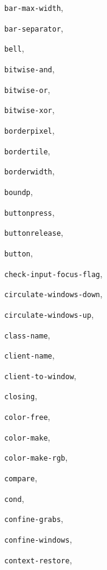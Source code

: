 \begin{theindex}
\item {\tt bar-max-width}, {\bf\pageref{bar-max-width}}
\item {\tt bar-separator}, {\bf\pageref{bar-separator}}
\item {\tt bell}, {\bf\pageref{bell}}
\item {\tt bitwise-and}, {\bf\pageref{bitwise-and}}
\item {\tt bitwise-or}, {\bf\pageref{bitwise-or}}
\item {\tt bitwise-xor}, {\bf\pageref{bitwise-xor}}
\item {\tt borderpixel}, {\bf\pageref{borderpixel}}
\item {\tt bordertile}, {\bf\pageref{bordertile}}
\item {\tt borderwidth}, {\bf\pageref{borderwidth}}
\item {\tt boundp}, {\bf\pageref{boundp}}
\item {\tt buttonpress}, {\bf\pageref{buttonpress}}
\item {\tt buttonrelease}, {\bf\pageref{buttonrelease}}
\item {\tt button}, {\bf\pageref{button}}
\item {\tt check-input-focus-flag}, {\bf\pageref{check-input-focus-flag}}
\item {\tt circulate-windows-down}, {\bf\pageref{circulate-windows-down}}
\item {\tt circulate-windows-up}, {\bf\pageref{circulate-windows-up}}
\item {\tt class-name}, {\bf\pageref{place-menu}}
\item {\tt client-name}, {\bf\pageref{place-menu}}
\item {\tt client-to-window}, {\bf\pageref{client-to-window}}
\item {\tt closing}, {\bf\pageref{closing}}
\item {\tt color-free}, {\bf\pageref{color-free}}
\item {\tt color-make}, {\bf\pageref{color-make}}
\item {\tt color-make-rgb}, {\bf\pageref{color-make-rgb}}
\item {\tt compare}, {\bf\pageref{compare}}
\item {\tt cond}, {\bf\pageref{cond}}
\item {\tt confine-grabs}, {\bf\pageref{confine-grabs}}
\item {\tt confine-windows}, {\bf\pageref{confine-windows}}
\item {\tt context-restore}, {\bf\pageref{context-restore}}

\end{theindex}
